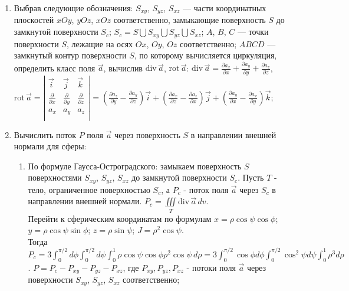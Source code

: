 \documentclass[14pt,a4paper,final]{extreport}
\begin{document}
\begin{enumerate}[label=\arabic*.]
	\item Выбрав следующие обозначения: \( S_{xy} \), \( S_{yz} \), \( S_{xz} \) --- части координатных плоскостей \( xOy \), \( yOz \), \( xOz \) соответственно, замыкающие поверхность \( S \) до замкнутой поверхности \( S_c \); \( S_c = S \bigcup S_{xy} \bigcup S_{yz} \bigcup S_{xz} \); \( A \), \( B \), \( C \) --- точки поверхности \( S \), лежащие на осях \( Ox \), \( Oy \), \( Oz \) соответственно; \( ABCD \) --- замкнутый контур поверхности \( S \), по которому вычисляется циркуляция,  определить класс поля \( \vec a \), вычислив  \( \mathrm{div} \, \vec a \),  \( \mathrm{rot} \, \vec a \):  \( \mathrm{div} \, \vec a = \frac{\partial a_x}{\partial x} + \frac{\partial a_y}{\partial y} + \frac{\partial a_z}{\partial z} \),
	\( \mathrm{rot} \, \vec a = \left| \begin{matrix}
		\vec i & \vec j & \vec k \\
		\frac{\partial}{\partial x} & \frac{\partial}{\partial y} & \frac{\partial}{\partial z} \\
		a_x & a_y & a_z \\
	\end{matrix} \right|
	= (\frac{\partial a_z}{\partial y} - \frac{\partial a_y}{\partial z})\vec i + (\frac{\partial a_x}{\partial z} - \frac{\partial a_z}{\partial x})\vec j + (\frac{\partial a_y}{\partial x} - \frac{\partial a_x}{\partial y})\vec k \);
	\item Вычислить поток \( P \) поля \( \vec a \) через поверхность \( S \) в направлении внешней нормали для сферы:
	\begin{enumerate}[label=\theenumi\arabic*]
		\item По формуле Гаусса-Остроградского: замыкаем поверхность \( S \)  поверхностями \( S_{xy} \), \( S_{yz} \), \( S_{xz} \) до замкнутой поверхности \( S_c \).
		Пусть  \( T \) - тело, ограниченное поверхностью  \( S_c \), а  \( P_c \) - поток поля \( \vec a \) через \( S_c \) в направлении внешней нормали.
		\( P_c = \iiint\limits_T \mathrm{div} \, \vec a\,dv \). 
		\bigskip
		\\Перейти к сферическим координатам по формулам \( x = \rho\cos\psi\cos\phi \); \( y = \rho\cos\psi\sin\phi \); \( z = \rho\sin\psi \); \( J = \rho^2\cos\psi \). 
		\bigskip
		\\Тогда \( P_c = 3\int_0^{\pi/2}{d\phi} \int_0^{\pi/2}{d\psi} \int_0^1{\rho\cos\psi\cos\phi\rho^2\cos\psi\,d\rho } = 3 \int_0^{\pi/2}\cos\phi d \phi \int_0^{\pi/2}\cos^2\psi d \psi \int_0^1\rho^3 d \rho \). \( P = P_c - P_{xy} - P_{yz} - P_{xz} \), где \( P_{xy}, P_{yz}, P_{xz} \) - потоки поля \( \vec a \) через поверхности \( S_{xy} \), \( S_{yz} \), \( S_{xz} \) соответственно;
		

\end{enumerate}
\end{enumerate}
\end{document}
